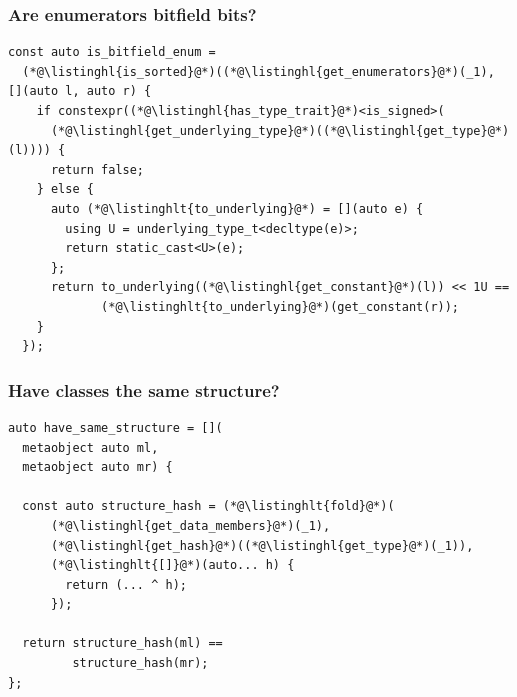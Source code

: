 \documentclass[compress,table,xcolor=table]{beamer}
\begin{document}
\begin{frame}[fragile]
  \frametitle{Are enumerators bitfield bits?}
  \begin{lstlisting}[language=c++2x,basicstyle=\footnotesize\ttfamily]
const auto is_bitfield_enum =
  (*@\listinghl{is_sorted}@*)((*@\listinghl{get_enumerators}@*)(_1), [](auto l, auto r) {
    if constexpr((*@\listinghl{has_type_trait}@*)<is_signed>(
      (*@\listinghl{get_underlying_type}@*)((*@\listinghl{get_type}@*)(l)))) {
      return false;
    } else {
      auto (*@\listinghlt{to_underlying}@*) = [](auto e) {
        using U = underlying_type_t<decltype(e)>;
        return static_cast<U>(e);
      };
      return to_underlying((*@\listinghl{get_constant}@*)(l)) << 1U ==
             (*@\listinghlt{to_underlying}@*)(get_constant(r));
    }
  });
  \end{lstlisting}
\end{frame}
\begin{frame}[fragile]
  \frametitle{Have classes the same structure?}
  \begin{lstlisting}[language=c++2x]
auto have_same_structure = [](
  metaobject auto ml,
  metaobject auto mr) {

  const auto structure_hash = (*@\listinghlt{fold}@*)(
      (*@\listinghl{get_data_members}@*)(_1),
      (*@\listinghl{get_hash}@*)((*@\listinghl{get_type}@*)(_1)),
      (*@\listinghlt{[]}@*)(auto... h) {
        return (... ^ h);
      });

  return structure_hash(ml) ==
         structure_hash(mr);
};
  \end{lstlisting}
\end{frame}
\end{document}

